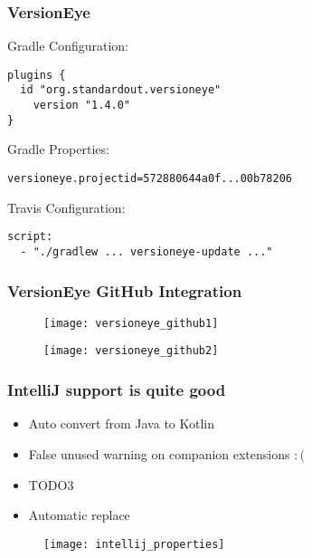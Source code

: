 
\begin{frame}[fragile] \frametitle{VersionEye} 
Gradle Configuration:
\begin{lstlisting}
plugins {
  id "org.standardout.versioneye"
    version "1.4.0"
}
\end{lstlisting}
\pause

Gradle Properties:
\begin{lstlisting}
versioneye.projectid=572880644a0f...00b78206
\end{lstlisting}
\pause


Travis Configuration:

\begin{lstlisting}
script:
  - "./gradlew ... versioneye-update ..."
\end{lstlisting}
 
\end{frame}


\begin{frame} \frametitle{VersionEye GitHub Integration} 


\begin{figure}[h]
\centering
  \texttt{[image: versioneye\_github1]}
\end{figure}
\begin{figure}[h]
\centering
  \texttt{[image: versioneye\_github2]}
\end{figure}
\end{frame}

\begin{frame}
\frametitle{IntelliJ support is quite good}
\begin{itemize}
	\item Auto convert from Java to Kotlin
	\item False unused warning on companion extensions $:($
	\item TODO3
	\item Automatic replace
\end{itemize}
\begin{figure}[h]
\centering
  \texttt{[image: intellij\_properties]}
\end{figure}

\end{frame}

